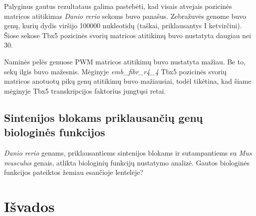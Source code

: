 \documentclass[12pt]{article}
\begin{document}
Palyginus gautus rezultataus galima pastebėti, kad visais atvejais pozicinės
matricos atitikimas \emph{Danio rerio} sekoms buvo panašus. Zebražuvės genome
buvo genų, kurių dydis viršijo 100000 nukleotidų (taškai, priklausantys I
ketvirčiui). Šiose sekose Tbx5 pozicinės svorių matricos atitikimų buvo
nustatyta daugiau nei 30.

Naminės pelės genuose PWM matricos atitikimų buvo nustatyta mažiau. Be to, sekų
ilgis buvo mažesnis. Mėginyje \emph{emb\_fibr\_r4\_4} Tbx5 pozicinės svorių
matricos anotuotų pikų genų atitikimų buvo mažiausiai, todėl tikėtina, kad šiame
mėginyje Tbx5 transkripcijos faktorius jungtųsi retai.

\subsection{Sintenijos blokams priklausančių genų biologinės funkcijos}
\emph{Danio rerio} genams, priklausantiems sintenijos blokams ir sutampantiems
su \emph{Mus musculus} genais, atlikta biologinių funkcijų nustatymo analizė.
Gautos biologinės funkcijos pateiktos žemiau esančioje lentelėje?





\newpage


\section{Išvados}

\newpage
\end{document}
